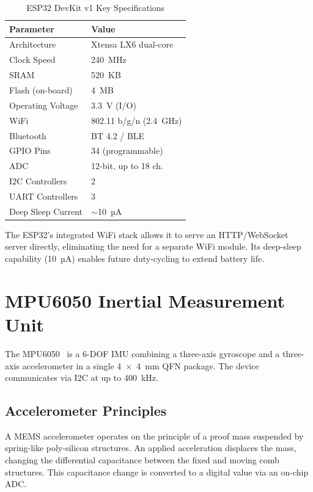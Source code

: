 \begin{table}[H]
\centering
\caption{ESP32 DevKit v1 Key Specifications}
\label{tab:esp32spec}
\begin{tabular}{ll}
\toprule
\textbf{Parameter}   & \textbf{Value}        \\
\midrule
Architecture         & Xtensa LX6 dual-core  \\
Clock Speed          & 240~MHz               \\
SRAM                 & 520~KB                \\
Flash (on-board)     & 4~MB                  \\
Operating Voltage    & 3.3~V (I/O)           \\
WiFi                 & 802.11 b/g/n (2.4~GHz)\\
Bluetooth            & BT 4.2 / BLE          \\
GPIO Pins            & 34 (programmable)     \\
ADC                  & 12-bit, up to 18 ch.  \\
I2C Controllers      & 2                     \\
UART Controllers     & 3                     \\
Deep Sleep Current   & $\sim$10~µA            \\
\bottomrule
\end{tabular}
\end{table}

The ESP32's integrated WiFi stack allows it to serve an HTTP/WebSocket server directly,
eliminating the need for a separate WiFi module.
Its deep-sleep capability (10~µA) enables future duty-cycling to extend battery life.

\section{MPU6050 Inertial Measurement Unit}

The MPU6050~\cite{invensense2013mpu6050} is a 6-DOF IMU combining a three-axis
gyroscope and a three-axis accelerometer in a single 4~×~4~mm QFN package.
The device communicates via I2C at up to 400~kHz.

\subsection{Accelerometer Principles}

A MEMS accelerometer operates on the principle of a proof mass suspended by
spring-like poly-silicon structures.
An applied acceleration displaces the mass, changing the differential capacitance
between the fixed and moving comb structures.
This capacitance change is converted to a digital value via an on-chip ADC.

